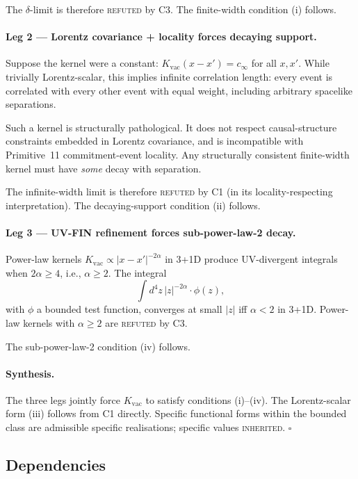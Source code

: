 \documentclass[11pt,a4paper]{article}
\begin{document}
The $\delta$-limit is therefore \textsc{refuted} by C3. The finite-width condition (i) follows.

\paragraph{Leg 2 --- Lorentz covariance + locality forces decaying support.}
Suppose the kernel were a constant: $K_\mathrm{vac}(x - x') = c_\infty$ for all $x, x'$. While trivially Lorentz-scalar, this implies infinite correlation length: every event is correlated with every other event with equal weight, including arbitrary spacelike separations.

Such a kernel is structurally pathological. It does not respect causal-structure constraints embedded in Lorentz covariance, and is incompatible with Primitive~11 commitment-event locality. Any structurally consistent finite-width kernel must have \emph{some} decay with separation.

The infinite-width limit is therefore \textsc{refuted} by C1 (in its locality-respecting interpretation). The decaying-support condition (ii) follows.

\paragraph{Leg 3 --- UV-FIN refinement forces sub-power-law-2 decay.}
Power-law kernels $K_\mathrm{vac} \propto |x - x'|^{-2\alpha}$ in 3+1D produce UV-divergent integrals when $2\alpha \geq 4$, i.e., $\alpha \geq 2$. The integral
\begin{equation}
\int d^4 z \, |z|^{-2\alpha} \cdot \phi(z),
\end{equation}
with $\phi$ a bounded test function, converges at small $|z|$ iff $\alpha < 2$ in 3+1D. Power-law kernels with $\alpha \geq 2$ are \textsc{refuted} by C3.

The sub-power-law-2 condition (iv) follows.

\paragraph{Synthesis.}
The three legs jointly force $K_\mathrm{vac}$ to satisfy conditions (i)--(iv). The Lorentz-scalar form (iii) follows from C1 directly. Specific functional forms within the bounded class are admissible specific realisations; specific values \textsc{inherited}. $\square$

\subsection{Dependencies}
\end{document}
